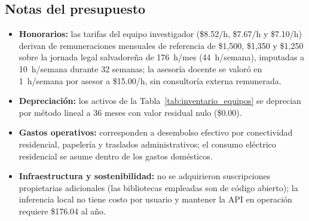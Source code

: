 \subsection*{Notas del presupuesto}
\begin{itemize}\setlength{\itemsep}{4pt}
\item \textbf{Honorarios:} las tarifas del equipo investigador (\$8.52/h, \$7.67/h y \$7.10/h) derivan de remuneraciones mensuales de referencia de \$1,500, \$1,350 y \$1,250 sobre la jornada legal salvadore\~na de 176~h/mes (44~h/semana), imputadas a 10~h/semana durante 32 semanas; la asesor\'ia docente se valor\'o en 1~h/semana por asesor a \$15.00/h, sin consultor\'ia externa remunerada.
\item \textbf{Depreciaci\'on:} los activos de la Tabla~\ref{tab:inventario_equipos} se deprecian por m\'etodo lineal a 36 meses con valor residual nulo (\$0.00).
\item \textbf{Gastos operativos:} corresponden a desembolso efectivo por conectividad residencial, papeler\'ia y traslados administrativos; el consumo el\'ectrico residencial se asume dentro de los gastos dom\'esticos.
\item \textbf{Infraestructura y sostenibilidad:} no se adquirieron suscripciones propietarias adicionales (las bibliotecas empleadas son de c\'odigo abierto); la inferencia local no tiene costo por usuario y mantener la API en operaci\'on requiere \$176.04 al a\~no.
\end{itemize}
